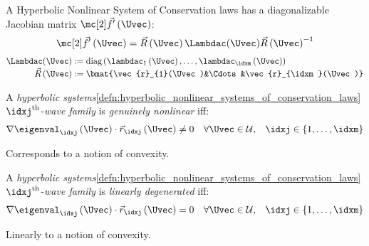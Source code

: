 \begin{corbox}\nospacing
    \begin{cor}[Diagonalizability]\label{cor:diagonalizability_non_linear_systems_of_conervations_laws}
        A Hyperbolic Nonlinear System of Conservation laws has a diagonalizable Jacobian matrix $\fluxvec'\left(\Uvec\right)$:
        \begin{align}
          \fluxvec'\left(\Uvec\right)=\vec{R}\left(\Uvec\right)\Lambdac(\Uvec)\vec{R}\left(\Uvec\right)^{-1}
        \end{align}
        \begin{align*}
            \Lambdac(\Uvec)&:=\text{diag}\left(\lambdac_{1}\left(\Uvec\right),\ldots,\lambdac_{\idxm}\left(\Uvec\right)\right)\\[-1\jot]
            \vec{R}\left(\Uvec\right)&:=\bmat{\vec{r}_{1}(\Uvec)&\Cdots&\vec{r}_{\idxm}(\Uvec)}
        \end{align*}
    \end{cor}
\end{corbox}
\begin{defnbox}\nospacing
    \begin{defn}\label{defn:genuinely_nonlinear_wave_family}
        A \textit{hyperbolic systems}\cref{defn:hyperbolic_nonlinear_systems_of_conservation_laws} $\idxj^{\text{th}}$-\textit{wave family} is
        \textit{genuinely nonlinear} iff:
        \begin{align}
          \nabla\eigenval_{\idxj}\left(\Uvec\right)\cdot\vec{r}_{\idxj}\left(\Uvec\right)\neq0&&\forall\Uvec\in\admissibleset,&&\idxj\in \left\{1,\ldots,\idxm\right\}\label{eq:genuinely_nonlinear_wave_family}
        \end{align}
    \end{defn}
\end{defnbox}
\begin{explanationbox}\nospacing
    \begin{explanation}
        Corresponds to a notion of convexity.
    \end{explanation}
\end{explanationbox}
\begin{defnbox}\nospacing
    \begin{defn}\label{defn:linearly_degenerat_wave_family}
        A \textit{hyperbolic systems}\cref{defn:hyperbolic_nonlinear_systems_of_conservation_laws} $\idxj^{\text{th}}$-\textit{wave family} is
        \textit{linearly degenerated} iff:
        \begin{align}
          \nabla\eigenval_{\idxj}\left(\Uvec\right)\cdot\vec{r}_{\idxj}\left(\Uvec\right)=0&&\forall\Uvec\in\admissibleset,&&\idxj\in \left\{1,\ldots,\idxm\right\}\label{eq:linearly_degenerat_wave_family}
        \end{align}
    \end{defn}
\end{defnbox}
\begin{explanationbox}\nospacing
    \begin{explanation}
        Linearly to a notion of convexity.
    \end{explanation}
\end{explanationbox}



